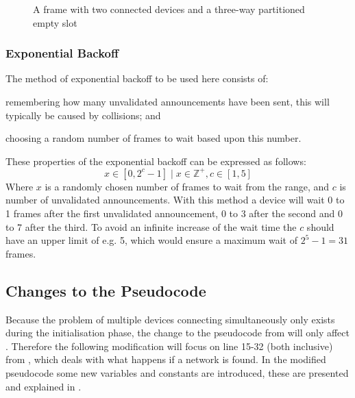 \begin{figure}[h]
    \centering \footnotesize
    
    \caption{A frame with two connected devices and a three-way partitioned empty slot}
    \label{fig:frame_wsubslots}
\end{figure}


\subsubsection{Exponential Backoff} %
\label{ssub:exponential_backoff}
The method of exponential backoff to be used here consists of:
\begin{enumerate*}[label=\itshape \alph*\upshape)]
    \item remembering how many unvalidated announcements have been sent, this will typically be caused by collisions; and
    \item choosing a random number of frames to wait based upon this number.   
\end{enumerate*}
These properties of the exponential backoff can be expressed as follows:
\begin{equation}
     x \in [0, 2^c - 1] \mid x \in \mathbb{Z}^+, c \in [1,5]
\end{equation}
Where $x$ is a randomly chosen number of frames to wait from the range, and $c$ is number of unvalidated announcements. With this method a device will wait 0 to 1 frames after the first unvalidated announcement, 0 to 3 after the second and 0 to 7 after the third. To avoid an infinite increase of the wait time the $c$ should have an upper limit of e.g. 5, which would ensure a maximum wait of $2^5-1 = 31$ frames.


\subsection{Changes to the Pseudocode} %
\label{sub:changes_to_the_pseudocode}
Because the problem of multiple devices connecting simultaneously only exists during the initialisation phase, the change to the pseudocode from  will only affect .
Therefore the following modification will focus on line 15-32 (both inclusive) from , which deals with what happens if a network is found.
In the modified pseudocode some new variables and constants are introduced, these are presented and explained in .

